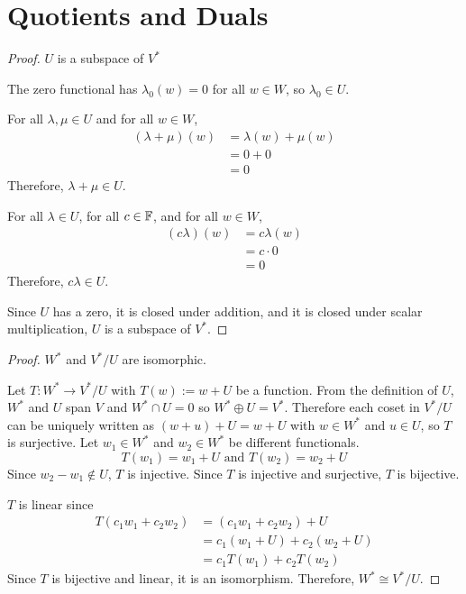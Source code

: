 \section{Quotients and Duals}
\begin{proof} $U$ is a subspace of $V^*$\gap

    The zero functional has $\lambda_0(w) = 0$ 
    for all $w \in W$, so $\lambda_0 \in U$.\gap

    For all $\lambda, \mu \in U$ and for all $w \in W$,
    \begin{align*}
        (\lambda + \mu)(w)
        &= \lambda(w) + \mu(w)\\
        &= 0 + 0\\
        &= 0
    \end{align*}
    Therefore, $\lambda + \mu \in U$.\gap

    For all $\lambda \in U$, for all $c \in \mathbb{F}$, and for all $w \in W$,
    \begin{align*}
        (c\lambda)(w)
        &= c\lambda(w)\\
        &= c \cdot 0\\
        &= 0
    \end{align*}
    Therefore, $c\lambda \in U$.\gap

    Since $U$ has a zero, it is closed under addition, 
    and it is closed under scalar multiplication, $U$ is a subspace of $V^*$.
\end{proof}
\begin{proof} $W^*$ and $V^*/U$ are isomorphic.\gap
    
    Let $T: W^* \rightarrow V^*/U$ with $T(w) := w + U$ be a function.
    From the definition of $U$, 
    $W^*$ and $U$ span $V$ and $W^* \cap U = 0$
    so $W^* \oplus U = V^*$.
    Therefore each coset in $V^*/U$ can be uniquely written 
    as $(w+u) + U = w+U$ with $w \in W^*$ and $u \in U$, so $T$ is surjective.
    Let $w_1 \in W^*$ and $w_2 \in W^*$ be different functionals.
    \[
        T(w_1) = w_1 + U
        \text{ and }
        T(w_2) = w_2 + U
    \]
    Since $w_2-w_1 \notin U$, $T$ is injective.
    Since $T$ is injective and surjective, $T$ is bijective.\gap

    $T$ is linear since
    \begin{align*}
        T(c_1w_1 + c_2w_2) 
        &=(c_1w_1 + c_2w_2) + U\\
        &= c_1(w_1 + U) + c_2(w_2 + U)\\
        &= c_1T(w_1) + c_2T(w_2)
    \end{align*}
    Since $T$ is bijective and linear, it is an isomorphism.
    Therefore, $W^* \cong V^*/U$.
\end{proof}
